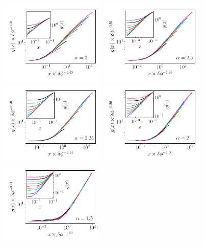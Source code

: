 \begin{figure}[h]
\centering
\includegraphics[width=0.45\textwidth]{Chapitre3/Figures/Interpretation/PCorrMF/PCorr_rescaled_MF_alpha3.pdf}
\includegraphics[width=0.45\textwidth]{Chapitre3/Figures/Interpretation/PCorrMF/PCorr_rescaled_MF_alpha25.pdf}
\includegraphics[width=0.45\textwidth]{Chapitre3/Figures/Interpretation/PCorrMF/PCorr_rescaled_MF_alpha225.pdf}
\includegraphics[width=0.45\textwidth]{Chapitre3/Figures/Interpretation/PCorrMF/PCorr_rescaled_MF_alpha2.pdf}
\includegraphics[width=0.45\textwidth]{Chapitre3/Figures/Interpretation/PCorrMF/PCorr_rescaled_MF_alpha15.pdf}

\end{figure}

